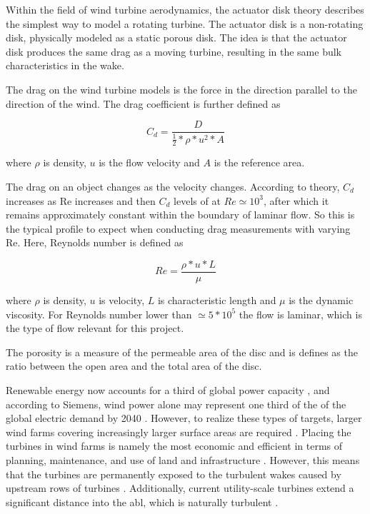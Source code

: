 Within the field of wind turbine aerodynamics, the actuator disk theory describes the simplest way to model a rotating turbine. The actuator disk is a non-rotating disk, physically modeled as a static porous disk. The idea is that the actuator disk produces the same drag as a moving turbine, resulting in the same bulk characteristics in the wake. 

The drag on the wind turbine models is the force in the direction parallel to the direction of the wind. The drag coefficient is further defined as 

\begin{equation}
    C_d = \frac{D}{\frac{1}{2}*\rho*u^2*A}
    \label{Eq:Cd}
\end{equation}

where $\rho$ is density, $u$ is the flow velocity and $A$ is the reference area.  

The drag on an object changes as the velocity changes. According to theory, $C_d$ increases as Re increases and then $C_d$ levels of at $ Re \simeq 10^3$, after which it remains approximately constant within the boundary of laminar flow. So this is the typical profile to expect when conducting drag measurements with varying Re. Here, Reynolds number is defined as 

\begin{equation}
    Re = \frac{\rho * u * L}{\mu}
\end{equation}

where $\rho$ is density, $u$ is velocity, $L$ is characteristic length and $\mu$ is the dynamic viscosity. For Reynolds number lower than $\simeq 5 * 10^5$ the flow is laminar, which is the type of flow relevant for this project. 






The porosity is a measure of the permeable area of the disc and is defines as the ratio between the open area and the total area of the disc. 


Renewable energy now accounts for a third of global power capacity \cite{RenEnThirty}, and according to Siemens, wind power alone may represent one third of the of the global electric demand by 2040 \cite{WindThirty}. However, to realize these types of targets, larger wind farms covering increasingly larger surface areas are required \cite{Meyers2012} \cite{Stevens2017}. Placing the turbines in wind farms is namely the most economic and efficient in terms of planning, maintenance, and use of land and infrastructure \cite{Neunaber}. However, this means that the turbines are permanently exposed to the turbulent wakes caused by upstream rows of turbines \cite{Tossas2014}. Additionally, current utility-scale turbines extend a significant distance into the \gls{abl}, which is naturally turbulent \cite{Neunaber} \cite{Tossas2014}. 

